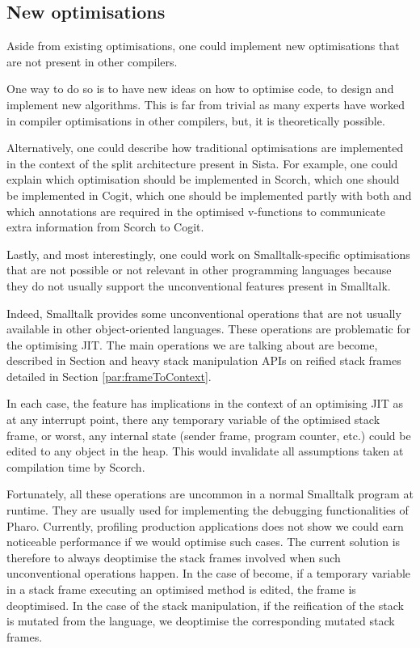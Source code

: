 \documentclass[a4paper,12pt,twoside]{../includes/ThesisStyle}
\begin{document}
\subsection{New optimisations}

Aside from existing optimisations, one could implement new optimisations that are not present in other compilers. 

One way to do so is to have new ideas on how to optimise code, to design and implement new algorithms. This is far from trivial as many experts have worked in compiler optimisations in other compilers, but, it is theoretically possible.

Alternatively, one could describe how traditional optimisations are implemented in the context of the split architecture present in Sista. For example, one could explain which optimisation should be implemented in Scorch, which one should be implemented in Cogit, which one should be implemented partly with both and which annotations are required in the optimised v-functions to communicate extra information from Scorch to Cogit. 

Lastly, and most interestingly, one could work on Smalltalk-specific optimisations that are not possible or not relevant in other programming languages because they do not usually support the unconventional features present in Smalltalk.

Indeed, Smalltalk provides some unconventional operations that are not usually available in other object-oriented languages. These operations are problematic for the optimising JIT. The main operations we are talking about are become, described in Section \label{par:become} and heavy stack manipulation APIs on reified stack frames detailed in Section \ref{par:frameToContext}. 

In each case, the feature has implications in the context of an optimising JIT as at any interrupt point, there any temporary variable of the optimised stack frame, or worst, any internal state (sender frame, program counter, etc.) could be edited to any object in the heap. This would invalidate all assumptions taken at compilation time by Scorch.

Fortunately, all these operations are uncommon in a normal Smalltalk program at runtime. They are usually used for implementing the debugging functionalities of Pharo. Currently, profiling production applications does not show we could earn noticeable performance if we would optimise such cases. The current solution is therefore to always deoptimise the stack frames involved when such unconventional operations happen. In the case of become, if a temporary variable in a stack frame executing an optimised method is edited, the frame is deoptimised. In the case of the stack manipulation, if the reification of the stack is mutated from the language, we deoptimise the corresponding mutated stack frames.
\end{document}
